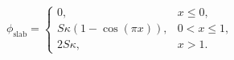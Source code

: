 $$
\phi_{\mathrm{slab}} = \begin{cases}
0, & x\le 0,\\
S \kappa \left(1 - \cos{\left(\pi x \right)}\right), & 0<x\le 1,\\
2 S \kappa, & x>1.
\end{cases}
$$
